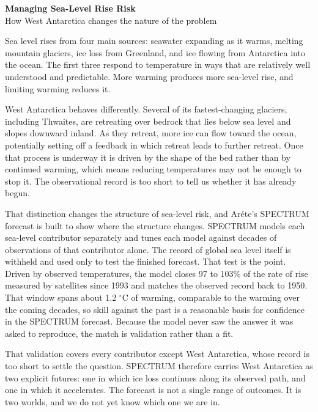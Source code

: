 \documentclass[11pt]{article}
\begin{document}
\begin{center}
{\Large\bfseries Managing Sea-Level Rise Risk}\\[3pt]
{\normalsize How West Antarctica changes the nature of the problem}
\end{center}

Sea level rises from four main sources: seawater expanding as it warms, melting mountain glaciers, ice loss from Greenland, and ice flowing from Antarctica into the ocean. The first three respond to temperature in ways that are relatively well understood and predictable. More warming produces more sea-level rise, and limiting warming reduces it.

West Antarctica behaves differently. Several of its fastest-changing glaciers, including Thwaites, are retreating over bedrock that lies below sea level and slopes downward inland. As they retreat, more ice can flow toward the ocean, potentially setting off a feedback in which retreat leads to further retreat. Once that process is underway it is driven by the shape of the bed rather than by continued warming, which means reducing temperatures may not be enough to stop it. The observational record is too short to tell us whether it has already begun.

That distinction changes the structure of sea-level risk, and Ar\'{e}te's SPECTRUM forecast is built to show where the structure changes. SPECTRUM models each sea-level contributor separately and tunes each model against decades of observations of that contributor alone. The record of global sea level itself is withheld and used only to test the finished forecast. That test is the point. Driven by observed temperatures, the model closes 97 to 103\% of the rate of rise measured by satellites since 1993 and matches the observed record back to 1950. That window spans about 1.2 $^\circ$C of warming, comparable to the warming over the coming decades, so skill against the past is a reasonable basis for confidence in the SPECTRUM forecast. Because the model never saw the answer it was asked to reproduce, the match is validation rather than a fit.

That validation covers every contributor except West Antarctica, whose record is too short to settle the question. SPECTRUM therefore carries West Antarctica as two explicit futures: one in which ice loss continues along its observed path, and one in which it accelerates. The forecast is not a single range of outcomes. It is two worlds, and we do not yet know which one we are in.
\end{document}
